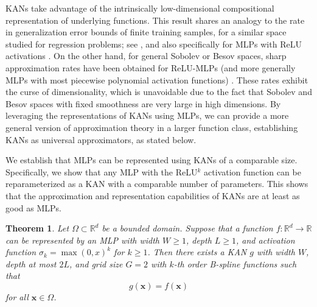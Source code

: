 \documentclass[12pt]{caltech_thesis}
\newtheorem{theorem}{Theorem}[section]
\numberwithin{equation}{section}
\begin{document}
KANs take advantage of the intrinsically low-dimensional compositional representation of underlying functions. This result shares an analogy to the rate in generalization error bounds of finite training samples, for a similar space studied for regression problems; see \cite{horowitz2007rate, kohler2021rate}, and also specifically for MLPs with ReLU activations \cite{schmidt2020nonparametric}. On the other hand, for general Sobolev or Besov spaces, sharp approximation rates have been obtained for ReLU-MLPs (and more generally MLPs with most piecewise polynomial activation functions) \cite{yarotsky2017error, bartlett2019nearly, siegel2023optimal}. These rates exhibit the curse of dimensionality, which is unavoidable due to the fact that Sobolev and Besov spaces with fixed smoothness are very large in high dimensions. By leveraging the representations of KANs using MLPs, we can provide a more general version of approximation theory in a larger function class, establishing KANs as universal approximators, as stated below.

We establish that MLPs can be represented using KANs of a comparable size. Specifically, we show that any MLP with the ReLU$^k$ activation function can be reparameterized as a KAN with a comparable number of parameters. This shows that the approximation and representation capabilities of KANs are at least as good as MLPs. 
\begin{theorem}\label{mlp-kan-representation-thm}
    Let $\Omega\subset \mathbb{R}^d$ be a bounded domain. Suppose that a function $f:\mathbb{R}^d\rightarrow \mathbb{R}$ can be represented by an MLP with width $W\geq 1$, depth $L\geq 1$, and activation function $\sigma_k = \max(0,x)^k$ for $k \geq 1$. Then there exists a KAN $g$ with width $W$, depth at most $2L$, and grid size $G = 2$ with $k$-th order B-spline functions such that
    \begin{equation}
        g(\mathbf{x}) = f(\mathbf{x})
    \end{equation}
    for all $\mathbf{x}\in \Omega$.
\end{theorem}
\end{document}
